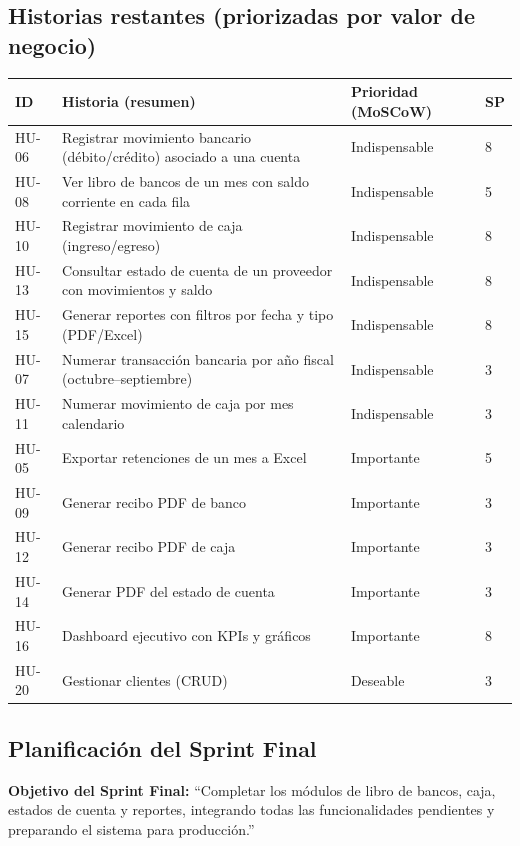 \documentclass[stu]{apa7}
\begin{document}
\subsection{Historias restantes (priorizadas por valor de negocio)}

\begin{longtable}{|C{0.8cm}|L{5cm}|C{2cm}|C{1.5cm}|}
\hline
{}
\textbf{ID} & \textbf{Historia (resumen)} & \textbf{Prioridad (MoSCoW)} & \textbf{SP} \\
\hline
HU-06 & Registrar movimiento bancario (débito/crédito) asociado a una cuenta & Indispensable & 8 \\
\hline
HU-08 & Ver libro de bancos de un mes con saldo corriente en cada fila & Indispensable & 5 \\
\hline
HU-10 & Registrar movimiento de caja (ingreso/egreso) & Indispensable & 8 \\
\hline
HU-13 & Consultar estado de cuenta de un proveedor con movimientos y saldo & Indispensable & 8 \\
\hline
HU-15 & Generar reportes con filtros por fecha y tipo (PDF/Excel) & Indispensable & 8 \\
\hline
HU-07 & Numerar transacción bancaria por año fiscal (octubre--septiembre) & Indispensable & 3 \\
\hline
HU-11 & Numerar movimiento de caja por mes calendario & Indispensable & 3 \\
\hline
HU-05 & Exportar retenciones de un mes a Excel & Importante & 5 \\
\hline
HU-09 & Generar recibo PDF de banco & Importante & 3 \\
\hline
HU-12 & Generar recibo PDF de caja & Importante & 3 \\
\hline
HU-14 & Generar PDF del estado de cuenta & Importante & 3 \\
\hline
HU-16 & Dashboard ejecutivo con KPIs y gráficos & Importante & 8 \\
\hline
HU-20 & Gestionar clientes (CRUD) & Deseable & 3 \\
\hline
\end{longtable}

\subsection{Planificación del Sprint Final}

\textbf{Objetivo del Sprint Final:} \enquote{Completar los módulos de libro de bancos, caja, estados de cuenta y reportes, integrando todas las funcionalidades pendientes y preparando el sistema para producción.}
\end{document}

